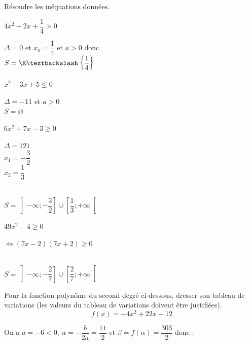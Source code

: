 \documentclass[12pt,a4paper]{article}  %
\begin{document}
Résoudre les inéquations données.
\begin{enumMet}
    \item $4 x^{2}-2 x+\dfrac{1}{4}>0$ 
    \begin{corrBox}
    	$\Delta=0$ et $x_0=\dfrac{1}{4}$ et $a>0$ donc\\ $S=\R\textbackslash\left\{\dfrac{1}{4}\right\}$
    \end{corrBox}
    \item $x^{2}-3 x+5 \leqslant 0$ 
    \begin{corrBox}
    	$\Delta=-11$ et $a>0$\\
    	$S=\varnothing$ 
    \end{corrBox}
    \item $6 x^{2}+7 x-3 \geqslant 0$ 
    \begin{corrBox}
    	$\Delta=121$\\
    	$x_1=-\dfrac{3}{2}$\\
    	$x_2=\dfrac{1}{3}$\\
    	\\
    	$S=\left]-\infty;-\dfrac{3}{2}\right]\cup\left[\dfrac{1}{3}; +\infty\right[$
    \end{corrBox}
    \item $49 x^{2}-4 \geqslant 0$ 
    \begin{corrBox}
    	$\iff (7x-2)(7x+2) \geqslant 0$\\
    	\\
    	$S=\left]-\infty;-\dfrac{2}{7}\right]\cup\left[\dfrac{2}{7}; +\infty\right[$
    \end{corrBox}
\end{enumMet}

\vspace{-0.3cm}
Pour la fonction polynôme du second degré ci-dessous, dresser son tableau de variations (les valeurs du tableau de variations doivent être justifiées).
$$f(x)=-4x^2+22x+12$$
\begin{corrBox}
	On a $a=-6<0$, $\alpha=-\dfrac{b}{2a}=\dfrac{11}{2}$ et $\beta=f(\alpha)=\dfrac{303}{2}$ donc :\\
	\ \\
\end{corrBox}
\end{document}
